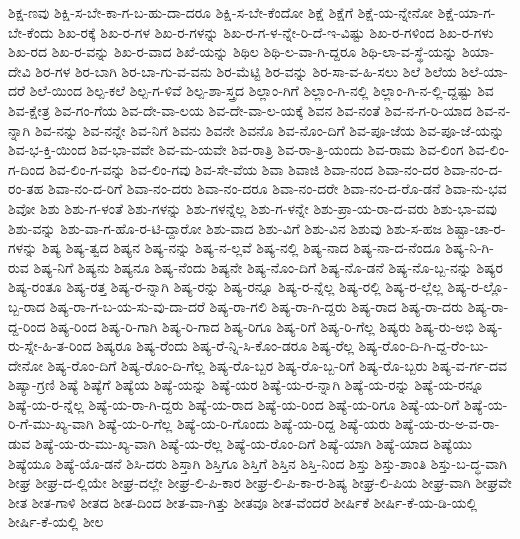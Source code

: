 {ಶಿಕ್ಷ-ಣವು
ಶಿಕ್ಷಿ-ಸ-ಬೇ-ಕಾ-ಗ-ಬ-ಹು-ದಾ-ದರೂ
ಶಿಕ್ಷಿ-ಸ-ಬೇ-ಕೆಂದೋ
ಶಿಕ್ಷೆ
ಶಿಕ್ಷೆಗೆ
ಶಿಕ್ಷೆ-ಯ-ನ್ನೇನೋ
ಶಿಕ್ಷೆ-ಯಾ-ಗ-ಬೇ-ಕೆಂದು
ಶಿಖ-ರಕ್ಕೆ
ಶಿಖ-ರ-ಗಳ
ಶಿಖ-ರ-ಗಳನ್ನು
ಶಿಖ-ರ-ಗ-ಳ-ನ್ನೇ-ರಿ-ದೆ-ಇ-ವಿಷ್ಟು
ಶಿಖ-ರ-ಗಳಿಂದ
ಶಿಖ-ರ-ಗಳು
ಶಿಖ-ರದ
ಶಿಖ-ರ-ವನ್ನು
ಶಿಖ-ರ-ವಾದ
ಶಿಖೆ-ಯನ್ನು
ಶಿಥಿಲ
ಶಿಥಿ-ಲ-ವಾ-ಗಿ-ದ್ದರೂ
ಶಿಥಿ-ಲಾ-ವ-ಸ್ಥೆ-ಯನ್ನು
ಶಿಯಾ-ದೇವಿ
ಶಿರ-ಗಳ
ಶಿರ-ಬಾಗಿ
ಶಿರ-ಬಾ-ಗು-ವ-ವನು
ಶಿರ-ಮೆಟ್ಟಿ
ಶಿರ-ವನ್ನು
ಶಿರ-ಸಾ-ವ-ಹಿ-ಸಲು
ಶಿಲೆ
ಶಿಲೆಯ
ಶಿಲೆ-ಯಾ-ದರೆ
ಶಿಲೆ-ಯಿಂದ
ಶಿಲ್ಪ-ಕಲೆ
ಶಿಲ್ಪ-ಗ-ಳಿವೆ
ಶಿಲ್ಪ-ಶಾ-ಸ್ತ್ರದ
ಶಿಲ್ಲಾಂ-ಗಿಗೆ
ಶಿಲ್ಲಾಂ-ಗಿ-ನಲ್ಲಿ
ಶಿಲ್ಲಾಂ-ಗಿ-ನ-ಲ್ಲಿ-ದ್ದಷ್ಟು
ಶಿವ
ಶಿವ-ಕ್ಷೇತ್ರ
ಶಿವ-ಗಂ-ಗೆಯ
ಶಿವ-ದೇ-ವಾ-ಲಯ
ಶಿವ-ದೇ-ವಾ-ಲ-ಯಕ್ಕೆ
ಶಿವನ
ಶಿವ-ನಂತೆ
ಶಿವ-ನ-ಗ-ರಿ-ಯಾದ
ಶಿವ-ನ-ನ್ನಾಗಿ
ಶಿವ-ನನ್ನು
ಶಿವ-ನನ್ನೇ
ಶಿವ-ನಿಗೆ
ಶಿವನು
ಶಿವನೇ
ಶಿವನೊ
ಶಿವ-ನೊಂ-ದಿಗೆ
ಶಿವ-ಪೂ-ಜೆಯ
ಶಿವ-ಪೂ-ಜೆ-ಯನ್ನು
ಶಿವ-ಭ-ಕ್ತಿ-ಯಿಂದ
ಶಿವ-ಭಾ-ವವೇ
ಶಿವ-ಮ-ಯವೇ
ಶಿವ-ರಾತ್ರಿ
ಶಿವ-ರಾ-ತ್ರಿ-ಯಂದು
ಶಿವ-ರಾಮ
ಶಿವ-ಲಿಂಗ
ಶಿವ-ಲಿಂ-ಗ-ದಿಂದ
ಶಿವ-ಲಿಂ-ಗ-ವನ್ನು
ಶಿವ-ಲಿಂ-ಗವು
ಶಿವ-ಸೇ-ವೆಯ
ಶಿವಾ
ಶಿವಾಜಿ
ಶಿವಾ-ನಂದ
ಶಿವಾ-ನಂ-ದರ
ಶಿವಾ-ನಂ-ದ-ರಂ-ತಹ
ಶಿವಾ-ನಂ-ದ-ರಿಗೆ
ಶಿವಾ-ನಂ-ದರು
ಶಿವಾ-ನಂ-ದರೂ
ಶಿವಾ-ನಂ-ದರೇ
ಶಿವಾ-ನಂ-ದ-ರೊ-ಡನೆ
ಶಿವಾ-ನು-ಭವ
ಶಿವೋ
ಶಿಶು
ಶಿಶು-ಗ-ಳಂತೆ
ಶಿಶು-ಗಳನ್ನು
ಶಿಶು-ಗಳನ್ನೆಲ್ಲ
ಶಿಶು-ಗ-ಳನ್ನೇ
ಶಿಶು-ಪ್ರಾ-ಯ-ರಾ-ದ-ವರು
ಶಿಶು-ಭಾ-ವವು
ಶಿಶು-ವನ್ನು
ಶಿಶು-ವಾ-ಗ-ಹೊ-ರ-ಟಿ-ದ್ದಾರೋ
ಶಿಶು-ವಾದ
ಶಿಶು-ವಿಗೆ
ಶಿಶು-ವಿನ
ಶಿಶುವು
ಶಿಶು-ಸ-ಹಜ
ಶಿಷ್ಟಾ-ಚಾ-ರ-ಗಳನ್ನು
ಶಿಷ್ಯ
ಶಿಷ್ಯ-ತ್ವದ
ಶಿಷ್ಯನ
ಶಿಷ್ಯ-ನನ್ನು
ಶಿಷ್ಯ-ನ-ಲ್ಲವೆ
ಶಿಷ್ಯ-ನಲ್ಲಿ
ಶಿಷ್ಯ-ನಾದ
ಶಿಷ್ಯ-ನಾ-ದ-ನೆಂದೂ
ಶಿಷ್ಯ-ನಿ-ಗಿ-ರುವ
ಶಿಷ್ಯ-ನಿಗೆ
ಶಿಷ್ಯನು
ಶಿಷ್ಯನೂ
ಶಿಷ್ಯ-ನೆಂದು
ಶಿಷ್ಯನೇ
ಶಿಷ್ಯ-ನೊಂ-ದಿಗೆ
ಶಿಷ್ಯ-ನೊ-ಡನೆ
ಶಿಷ್ಯ-ನೊ-ಬ್ಬ-ನನ್ನು
ಶಿಷ್ಯರ
ಶಿಷ್ಯ-ರಂತೂ
ಶಿಷ್ಯ-ರತ್ತ
ಶಿಷ್ಯ-ರ-ನ್ನಾಗಿ
ಶಿಷ್ಯ-ರನ್ನು
ಶಿಷ್ಯ-ರನ್ನೂ
ಶಿಷ್ಯ-ರ-ನ್ನೆಲ್ಲ
ಶಿಷ್ಯ-ರಲ್ಲಿ
ಶಿಷ್ಯ-ರ-ಲ್ಲೆಲ್ಲ
ಶಿಷ್ಯ-ರ-ಲ್ಲೊ-ಬ್ಬ-ರಾದ
ಶಿಷ್ಯ-ರಾ-ಗ-ಬ-ಯ-ಸು-ವು-ದಾ-ದರೆ
ಶಿಷ್ಯ-ರಾ-ಗಲಿ
ಶಿಷ್ಯ-ರಾ-ಗಿ-ದ್ದರು
ಶಿಷ್ಯ-ರಾದ
ಶಿಷ್ಯ-ರಾ-ದರು
ಶಿಷ್ಯ-ರಾ-ದ್ದ-ರಿಂದ
ಶಿಷ್ಯ-ರಿಂದ
ಶಿಷ್ಯ-ರಿ-ಗಾಗಿ
ಶಿಷ್ಯ-ರಿ-ಗಾದ
ಶಿಷ್ಯ-ರಿಗೂ
ಶಿಷ್ಯ-ರಿಗೆ
ಶಿಷ್ಯ-ರಿ-ಗೆಲ್ಲ
ಶಿಷ್ಯರು
ಶಿಷ್ಯ-ರು-ಅಭಿ
ಶಿಷ್ಯ-ರು-ಸ್ನೇ-ಹಿ-ತ-ರಿಂದ
ಶಿಷ್ಯರೂ
ಶಿಷ್ಯ-ರೆಂದು
ಶಿಷ್ಯ-ರೆ-ನ್ನಿ-ಸಿ-ಕೊಂ-ಡರೂ
ಶಿಷ್ಯ-ರೆಲ್ಲ
ಶಿಷ್ಯ-ರೊಂ-ದಿ-ಗಿ-ದ್ದ-ರೆಂ-ಬು-ದೇನೋ
ಶಿಷ್ಯ-ರೊಂ-ದಿಗೆ
ಶಿಷ್ಯ-ರೊಂ-ದಿ-ಗೆಲ್ಲ
ಶಿಷ್ಯ-ರೊ-ಬ್ಬರ
ಶಿಷ್ಯ-ರೊ-ಬ್ಬ-ರಿಗೆ
ಶಿಷ್ಯ-ರೊ-ಬ್ಬರು
ಶಿಷ್ಯ-ವ-ರ್ಗ-ದವ
ಶಿಷ್ಯಾ-ಗ್ರಣಿ
ಶಿಷ್ಯೆ
ಶಿಷ್ಯೆಗೆ
ಶಿಷ್ಯೆಯ
ಶಿಷ್ಯೆ-ಯನ್ನು
ಶಿಷ್ಯೆ-ಯರ
ಶಿಷ್ಯೆ-ಯ-ರ-ನ್ನಾಗಿ
ಶಿಷ್ಯೆ-ಯ-ರನ್ನು
ಶಿಷ್ಯೆ-ಯ-ರನ್ನೂ
ಶಿಷ್ಯೆ-ಯ-ರ-ನ್ನೆಲ್ಲ
ಶಿಷ್ಯೆ-ಯ-ರಾ-ಗಿ-ದ್ದರು
ಶಿಷ್ಯೆ-ಯ-ರಾದ
ಶಿಷ್ಯೆ-ಯ-ರಿಂದ
ಶಿಷ್ಯೆ-ಯ-ರಿಗೂ
ಶಿಷ್ಯೆ-ಯ-ರಿಗೆ
ಶಿಷ್ಯೆ-ಯ-ರಿ-ಗೆ-ಮು-ಖ್ಯ-ವಾಗಿ
ಶಿಷ್ಯೆ-ಯ-ರಿ-ಗೆಲ್ಲ
ಶಿಷ್ಯೆ-ಯ-ರಿ-ಗೊಂದು
ಶಿಷ್ಯೆ-ಯ-ರಿದ್ದ
ಶಿಷ್ಯೆ-ಯರು
ಶಿಷ್ಯೆ-ಯ-ರು-ಅ-ವ-ರಾ-ಡುವ
ಶಿಷ್ಯೆ-ಯ-ರು-ಮು-ಖ್ಯ-ವಾಗಿ
ಶಿಷ್ಯೆ-ಯ-ರೆಲ್ಲ
ಶಿಷ್ಯೆ-ಯ-ರೊಂ-ದಿಗೆ
ಶಿಷ್ಯೆ-ಯಾಗಿ
ಶಿಷ್ಯೆ-ಯಾದ
ಶಿಷ್ಯೆಯು
ಶಿಷ್ಯೆಯೂ
ಶಿಷ್ಯೆ-ಯೊ-ಡನೆ
ಶಿಸಿ-ದರು
ಶಿಸ್ತಾಗಿ
ಶಿಸ್ತಿಗೂ
ಶಿಸ್ತಿಗೆ
ಶಿಸ್ತಿನ
ಶಿಸ್ತಿ-ನಿಂದ
ಶಿಸ್ತು
ಶಿಸ್ತು-ಶಾಂತಿ
ಶಿಸ್ತು-ಬ-ದ್ಧ-ವಾಗಿ
ಶೀಘ್ರ
ಶೀಘ್ರ-ದ-ಲ್ಲಿಯೇ
ಶೀಘ್ರ-ದಲ್ಲೇ
ಶೀಘ್ರ-ಲಿ-ಪಿ-ಕಾರ
ಶೀಘ್ರ-ಲಿ-ಪಿ-ಕಾ-ರ-ಶಿಷ್ಯ
ಶೀಘ್ರ-ಲಿ-ಪಿಯ
ಶೀಘ್ರ-ವಾಗಿ
ಶೀಘ್ರವೇ
ಶೀತ
ಶೀತ-ಗಾಳಿ
ಶೀತದ
ಶೀತ-ದಿಂದ
ಶೀತ-ವಾ-ಗಿತ್ತು
ಶೀತವೂ
ಶೀತ-ವೆಂದರೆ
ಶೀರ್ಷಿಕೆ
ಶೀರ್ಷಿ-ಕೆ-ಯ-ಡಿ-ಯಲ್ಲಿ
ಶೀರ್ಷಿ-ಕೆ-ಯಲ್ಲಿ
ಶೀಲ
}
